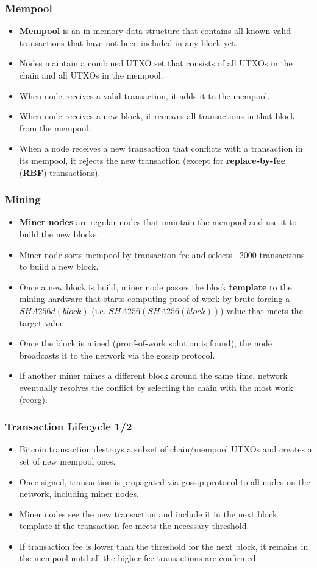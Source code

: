\documentclass{beamer}
\begin{document}
\begin{frame}
  \frametitle{Mempool}
  \begin{itemize}
  \item \textbf{Mempool} is an in-memory data structure that contains all known
    valid transactions that have not been included in any block yet.
  \item Nodes maintain a combined UTXO set that consists of all UTXOs in the
    chain and all UTXOs in the mempool.
  \item When node receives a valid transaction, it adds it to the mempool.
  \item When node receives a new block, it removes all transactions in that
    block from the mempool.
  \item When a node receives a new transaction that conflicts with a transaction
    in its mempool, it rejects the new transaction (except for
    \textbf{replace-by-fee} (\textbf{RBF}) transactions).
  \end{itemize}
\end{frame}

\begin{frame}
  \frametitle{Mining}
  \begin{itemize}
  \item \textbf{Miner nodes} are regular nodes that maintain the mempool and use
    it to build the new blocks.
  \item Miner node sorts mempool by transaction fee and selects ~2000
    transactions to build a new block.
  \item Once a new block is build, miner node passes the block \textbf{template}
    to the mining hardware that starts computing proof-of-work by brute-forcing
    a $SHA256d(block)$ (i.e. $SHA256(SHA256(block))$) value that meets the
    target value.
  \item Once the block is mined (proof-of-work solution is found), the node
    broadcasts it to the network via the gossip protocol.
  \item If another miner mines a different block around the same time, network
    eventually resolves the conflict by selecting the chain with the most work
    (reorg).
  \end{itemize}
\end{frame}

\begin{frame}
  \frametitle{Transaction Lifecycle 1/2}
  \begin{itemize}
  \item Bitcoin transaction destroys a subset of chain/mempool UTXOs and creates
    a set of new mempool ones.
  \item Once signed, transaction is propagated via gossip protocol to all nodes
    on the network, including miner nodes.
  \item Miner nodes see the new transaction and include it in the next block
    template if the transaction fee meets the necessary threshold.
  \item If transaction fee is lower than the threshold for the next block, it
    remains in the mempool until all the higher-fee transactions are confirmed.
  \end{itemize}
\end{frame}
\end{document}
